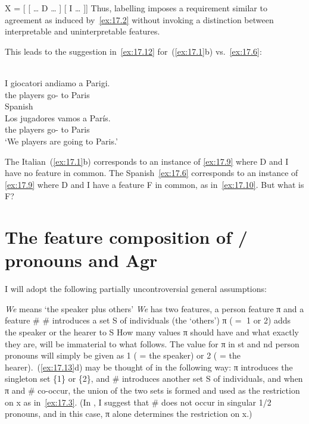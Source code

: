 \documentclass[output=paper]{langsci/langscibook}
\begin{document}
\ea\label{ex:17.11}
    X = [ [ \dots{} D \dots{} ] [ I \dots{} ]]
\z
Thus, labelling imposes a requirement similar to agreement as induced
by~\eqref{ex:17.2} without invoking a distinction between interpretable and
uninterpretable features.

This leads to the suggestion in~\eqref{ex:17.12} for~(\ref{ex:17.1}b) vs.\
\eqref{ex:17.6}:

\begin{exe}
     \\
    \gll I giocatori andiamo a Parigi.\\
    the players go-\Fpl{} to Paris\\
    \glt
\exi{\eqref{ex:17.6}} Spanish\\
    \gll    Los jugadores vamos a París.\\
            the players      go-\Fpl{} to Paris\\
    \glt    ‘We players are going to Paris.’\\
\end{exe}

\ea\label{ex:17.12}
    \ea The Italian~(\ref{ex:17.1}b) corresponds to an instance of
    \eqref{ex:17.9} where D and I have no feature in common.
    \ex The Spanish~\eqref{ex:17.6} corresponds to an instance of
    \eqref{ex:17.9} where D and I have a feature F in common, as
    in~\eqref{ex:17.10}.
    \z
\z
But what is F?

\section{The feature composition of \First/\Spl{} pronouns and
Agr}\label{sec:17.3}

I will adopt the following partially uncontroversial general assumptions:

\ea\label{ex:17.13}
    \ea \emph{We} means ‘the speaker plus others’
    \ex \emph{We} has two features, a person feature π and a feature \#
    \ex \# introduces a set S of individuals (the ‘others’)
    \ex π ($=$ 1 or 2) adds the speaker or the hearer to S
    \z
\z
How many values π should have and what exactly they are, will be immaterial
to what follows. The value for π in \First{}st and \Second{}nd person
pronouns will simply be given as 1 ( = the speaker) or 2 ( = the
hearer).~(\ref{ex:17.13}d) may be thought of in the following way: π
introduces the singleton set \{1\} or \{2\}, and \# introduces another set S of
individuals, and when π and \# co-occur, the union of the two sets is
formed and used as the restriction on x as in~\eqref{ex:17.3}. (In , I
suggest that \# does not occur in singular 1/2 pronouns, and in this case,
π alone determines the restriction on x.)
\end{document}
